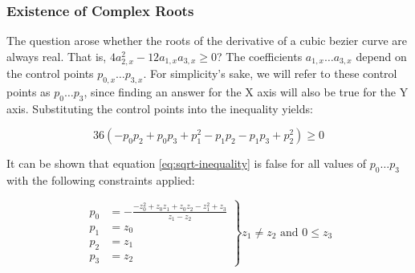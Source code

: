 \subsubsection{Existence of Complex Roots}

The question arose whether  the roots of the derivative of a cubic bezier curve
are always real. That is,  $4  a_{2,x}^2  -  12  a_{1,x}  a_{3,x}  \ge  0$? The
coefficients $a_{1,x} \ldots a_{3,x}$ depend  on  the  control  points $p_{0,x}
\ldots p_{3,x}$. For simplicity's sake, we  will  refer to these control points
as $p_0 \ldots  p_3$,  since finding an answer for the X axis will also be true
for  the  Y  axis. Substituting the control points into the inequality  yields:

\begin{equation}
    36 \left(-p_0p_2 + p_0p_3 + p_1^2 - p_1p_2 - p_1p_3 + p_2^2\right) \ge 0
    \label{eq:sqrt-inequality}
\end{equation}

It can be shown that  equation \ref{eq:sqrt-inequality} is false for all values
of $p_0 \ldots p_3$ with the following constraints applied:

\begin{equation}
    \left.
    \begin{array}{ll}
        p_0 &= -\frac{-z_0^2 + z_0z_1 + z_0z_2 - z_1^2 + z_3}{z_1 - z_2} \\
        p_1 &= z_0 \\
        p_2 &= z_1 \\
        p_3 &= z_2
    \end{array}
    \right\}\text{$z_1 \ne z_2$ and $0 \le z_3$}
\end{equation}
